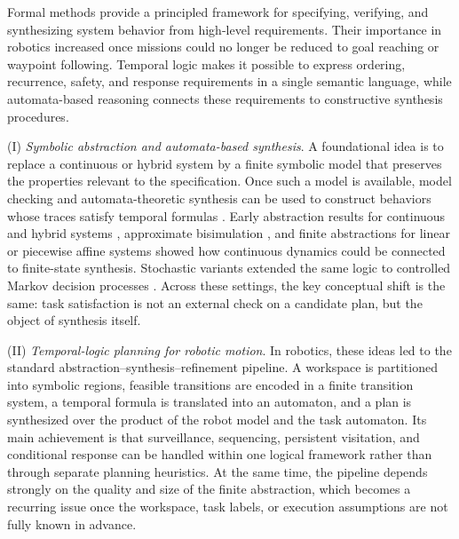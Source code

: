 Formal methods provide a principled framework for specifying, verifying, and synthesizing
system behavior from high-level requirements. Their importance in robotics increased once
missions could no longer be reduced to goal reaching or waypoint following. Temporal logic
makes it possible to express ordering, recurrence, safety, and response requirements in a
single semantic language, while automata-based reasoning connects these requirements to
constructive synthesis procedures.

 (I) \emph{Symbolic abstraction and automata-based synthesis}. A foundational
idea is to replace a continuous or hybrid system by a finite symbolic model that preserves
the properties relevant to the specification. Once such a model is available, model
checking and automata-theoretic synthesis can be used to construct behaviors whose traces
satisfy temporal formulas \citep{baier2008principles}. Early abstraction results for
continuous and hybrid systems \citep{alur2000discrete}, approximate bisimulation
\citep{girard2007approximately}, and finite abstractions for linear or piecewise affine
systems \citep{tabuada2006linear, kloetzer2008fully, yordanov2010formal} showed how
continuous dynamics could be connected to finite-state synthesis. Stochastic variants
extended the same logic to controlled Markov decision processes \citep{ding2011mdp}. Across
these settings, the key conceptual shift is the same: task satisfaction is not an external
check on a candidate plan, but the object of synthesis itself.

 (II) \emph{Temporal-logic planning for robotic motion}. In robotics, these ideas
led to the standard abstraction--synthesis--refinement pipeline. A workspace is
partitioned into symbolic regions, feasible transitions are encoded in a finite transition
system, a temporal formula is translated into an automaton, and a plan is synthesized over
the product of the robot model and the task automaton.  Its main achievement is that surveillance,
sequencing, persistent visitation, and conditional response can be handled within one
logical framework rather than through separate planning heuristics. At the same time, the
pipeline depends strongly on the quality and size of the finite abstraction, which becomes
a recurring issue once the workspace, task labels, or execution assumptions are not fully
known in advance.

